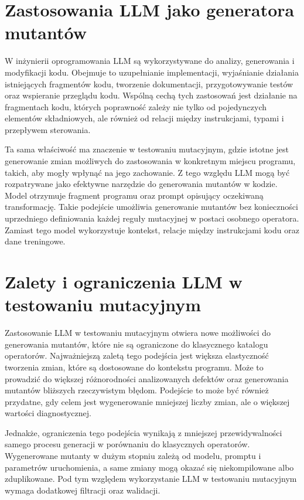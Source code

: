 \documentclass[12pt,a4paper,oldfontcommands]{memoir}
\theoremstyle{plain}
\theoremstyle{definition}
\theoremstyle{remark}
\begin{document}
    \section{Zastosowania LLM jako generatora mutantów}

    W inżynierii oprogramowania LLM są wykorzystywane do analizy, generowania i modyfikacji kodu.
    Obejmuje to uzupełnianie implementacji, wyjaśnianie działania istniejących fragmentów kodu, tworzenie dokumentacji, przygotowywanie testów oraz wspieranie przeglądu kodu.
    Wspólną cechą tych zastosowań jest działanie na fragmentach kodu, których poprawność zależy nie tylko od pojedynczych elementów składniowych, ale również od relacji między instrukcjami, typami i przepływem sterowania.

    Ta sama właściwość ma znaczenie w testowaniu mutacyjnym, gdzie istotne jest generowanie zmian możliwych do zastosowania w konkretnym miejscu programu, takich, aby mogły wpłynąć na jego zachowanie.
    Z tego względu LLM mogą być rozpatrywane jako efektywne narzędzie do generowania mutantów w kodzie.
    Model otrzymuje fragment programu oraz prompt opisujący oczekiwaną transformację.
    Takie podejście umożliwia generowanie mutantów bez konieczności uprzedniego definiowania każdej reguły mutacyjnej w postaci osobnego operatora.
    Zamiast tego model wykorzystuje kontekst, relacje między instrukcjami kodu oraz dane treningowe.

    \section{Zalety i ograniczenia LLM w testowaniu mutacyjnym}

    Zastosowanie LLM w testowaniu mutacyjnym otwiera nowe możliwości do generowania mutantów, które nie są ograniczone do klasycznego katalogu operatorów.
    Najważniejszą zaletą tego podejścia jest większa elastyczność tworzenia zmian, które są dostosowane do kontekstu programu.
    Może to prowadzić do większej różnorodności analizowanych defektów oraz generowania mutantów bliższych rzeczywistym błędom.
    Podejście to może być również przydatne, gdy celem jest wygenerowanie mniejszej liczby zmian, ale o większej wartości diagnostycznej.

    Jednakże, ograniczenia tego podejścia wynikają z mniejszej przewidywalności samego procesu generacji w porównaniu do klasycznych operatorów.
    Wygenerowane mutanty w dużym stopniu zależą od modelu, promptu i parametrów uruchomienia, a same zmiany mogą okazać się niekompilowane albo zduplikowane.
    Pod tym względem wykorzystanie LLM w testowaniu mutacyjnym wymaga dodatkowej filtracji oraz walidacji.
\end{document}
